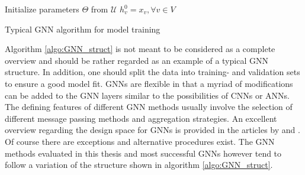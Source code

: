 	\begin{algorithm}
		\scriptsize
		\SetAlgoLined
		\nl Initialize parameters $\Theta$ from $\mathcal{U}$\;
		\nl $h_{v}^{0} = x_{v},\forall v \in V$\\
		\nl {}
		\caption{Typical GNN algorithm for model training}
		\label{algo:GNN_struct}
	\end{algorithm}

	\noindent Algorithm \ref{algo:GNN_struct} is not meant to be considered as
	a complete overview and should be rather regarded as an example of a typical 
	GNN structure. In addition, one should split the data into training-
	and validation sets to ensure a good model fit. GNNs are flexible in that a 
	myriad of modifications can be added to the GNN layers similar to the 
	possibilities of CNNs or ANNs. The defining features of different GNN 
	methods usually involve the selection of different message passing methods 
	and aggregation strategies. An excellent overview regarding the design space 
	for GNNs is provided in the articles by \cite{you2020design} and 
	\cite{zhou2020graph}. Of course there are exceptions and alternative 
	procedures exist. The GNN methods evaluated in this thesis and most 
	successful GNNs however tend to follow a variation of the structure shown in 
	algorithm \ref{algo:GNN_struct}.  \\

